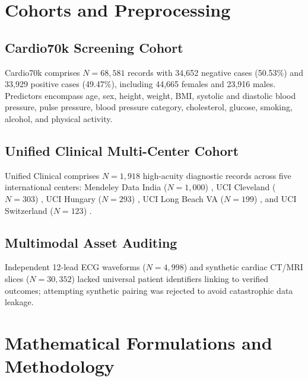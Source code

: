 \documentclass[conference]{IEEEtran}
\begin{document}
\section{Cohorts and Preprocessing}
\subsection{Cardio70k Screening Cohort}
Cardio70k comprises $N = 68,581$ records with 34,652 negative cases (50.53\%) and 33,929 positive cases (49.47\%), including 44,665 females and 23,916 males. Predictors encompass age, sex, height, weight, BMI, systolic and diastolic blood pressure, pulse pressure, blood pressure category, cholesterol, glucose, smoking, alcohol, and physical activity.

\subsection{Unified Clinical Multi-Center Cohort}
Unified Clinical comprises $N = 1,918$ high-acuity diagnostic records across five international centers: Mendeley Data India ($N = 1,000$) \cite{mendeley_india_2020}, UCI Cleveland ($N = 303$) \cite{detrano_uci_1989}, UCI Hungary ($N = 293$) \cite{detrano_uci_1989}, UCI Long Beach VA ($N = 199$) \cite{detrano_uci_1989}, and UCI Switzerland ($N = 123$) \cite{detrano_uci_1989}.

\subsection{Multimodal Asset Auditing}
Independent 12-lead ECG waveforms ($N = 4,998$) and synthetic cardiac CT/MRI slices ($N = 30,352$) lacked universal patient identifiers linking to verified outcomes; attempting synthetic pairing was rejected to avoid catastrophic data leakage.

\section{Mathematical Formulations and Methodology}
\end{document}
